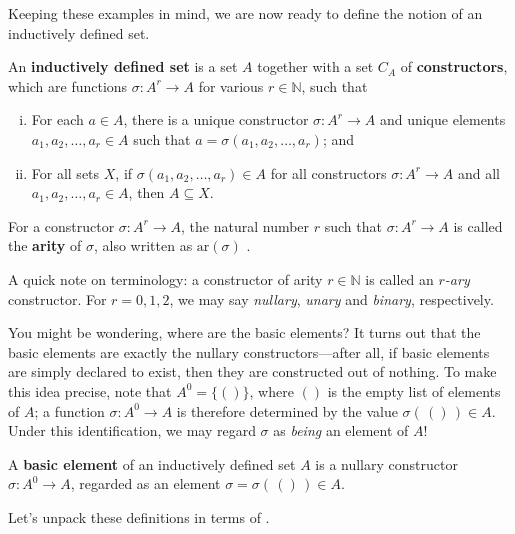 Keeping these examples in mind, we are now ready to define the notion of an inductively defined set.

\begin{definition}
\label{defInductivelyDefinedSet}
An \textbf{inductively defined set} is a set $A$ together with a set $C_A$ of \textbf{constructors}, which are functions $\sigma : A^r \to A$ for various $r \in \mathbb{N}$, such that
\begin{enumerate}[(i)]
\item For each $a \in A$, there is a unique constructor $\sigma : A^r \to A$ and unique elements $a_1,a_2,\dots,a_r \in A$ such that $a = \sigma(a_1,a_2,\dots,a_r)$; and
\item For all sets $X$, if $\sigma(a_1,a_2,\dots,a_r) \in A$ for all constructors $\sigma : A^r \to A$ and all $a_1,a_2,\dots,a_r \in A$, then $A \subseteq X$.
\end{enumerate}
For a constructor $\sigma : A^r \to A$, the natural number $r$ such that $\sigma : A^r \to A$ is called the \textbf{arity} of $\sigma$, also written as $\mathrm{ar}(\sigma)$ .
\end{definition}

A quick note on terminology: a constructor of arity $r \in \mathbb{N}$ is called an \textit{$r$-ary} constructor. For $r=0,1,2$, we may say \textit{nullary}, \textit{unary} and \textit{binary}, respectively.

You might be wondering, where are the basic elements? It turns out that the basic elements are exactly the nullary constructors---after all, if basic elements are simply declared to exist, then they are constructed out of nothing. To make this idea precise, note that $A^0 = \{ () \}$, where $()$ is the empty list of elements of $A$; a function $\sigma : A^0 \to A$ is therefore determined by the value $\sigma(\,()\,) \in A$. Under this identification, we may regard $\sigma$ as \textit{being} an element of $A$!

\begin{definition}
\label{defBasicElement}
A \textbf{basic element} of an inductively defined set $A$ is a nullary constructor $\sigma : A^0 \to A$, regarded as an element $\sigma = \sigma(\,()\,) \in A$.
\end{definition}

Let's unpack these definitions in terms of .

